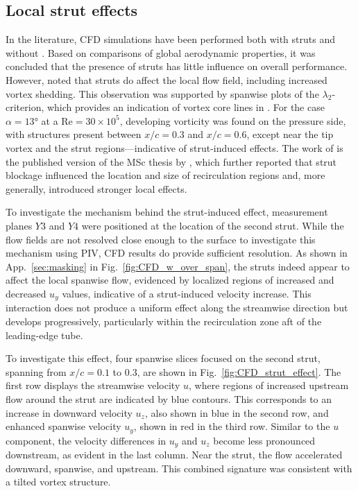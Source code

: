 \documentclass[wes, manuscript]{copernicus}
\begin{document}
\subsection{Local strut effects}
%
In the literature, CFD simulations have been performed both with struts \citep{Vire2022} and without \citep{Vire2020}. Based on comparisons of global aerodynamic properties, it was concluded that the presence of struts has little influence on overall performance. However, \cite{Vire2022} noted that struts do affect the local flow field, including increased vortex shedding. This observation was supported by 
spanwise plots of the $\lambda_2$-criterion, which provides an indication of vortex core lines in \citep{Jeong1995}. For the case $\alpha = 13\unit{\degree}$ at a $\textrm{Re} = 30 \times 10^5$, developing vorticity was found on the pressure side, with structures present between $x/c = 0.3$ and $x/c = 0.6$, except near the tip vortex and the strut regions—indicative of strut-induced effects. The work of \cite{Vire2022} is the published version of the MSc thesis by \cite{Lebesque2020}, which further reported that strut blockage influenced the location and size of recirculation regions and, more generally, introduced stronger local effects.

To investigate the mechanism behind the strut-induced effect, measurement planes $Y3$ and $Y4$ were positioned at the location of the second strut. While the flow fields are not resolved close enough to the surface to investigate this mechanism using PIV, CFD results do provide sufficient resolution. As shown in App.~\ref{sec:masking} in Fig.~\ref{fig:CFD_w_over_span}, the struts indeed appear to affect the local spanwise flow, evidenced by localized regions of increased and decreased $u_{y}$ values, indicative of a strut-induced velocity increase. This interaction does not produce a uniform effect along the streamwise direction but develops progressively, particularly within the recirculation zone aft of the leading-edge tube.

To investigate this effect, four spanwise slices focused on the second strut, spanning from $x/c = 0.1$ to $0.3$, are shown in Fig.~\ref{fig:CFD_strut_effect}. The first row displays the streamwise velocity $u$, where regions of increased upstream flow around the strut are indicated by blue contours. This corresponds to an increase in downward velocity $u_{z}$, also shown in blue in the second row, and enhanced spanwise velocity $u_{y}$, shown in red in the third row. Similar to the $u$ component, the velocity differences in $u_{y}$ and $u_{z}$ become less pronounced downstream, as evident in the last column. 
Near the strut, the flow accelerated downward, spanwise, and upstream. 
This combined signature was consistent with a tilted vortex structure.
\end{document}
